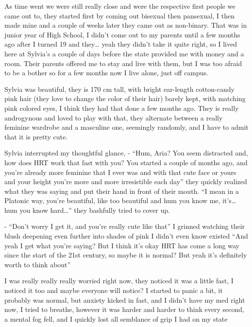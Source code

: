 \documentclass[hidelinks,12pt,a4paper]{book}
\begin{document}
As time went we were still really close and were the respective 
first people we came out to, they started first by coming out bisexual then pansexual, 
I then made mine and a couple of weeks later they came out as non-binary. That was in junior year of High School,
 I didn't come out to my parents until a few months ago after I turned 19 and they… yeah they didn't take it quite right, so
I lived here at Sylvia's a couple of days before the state provided me with money and a room. 
Their parents offered me to stay and live with them, but I was too afraid to be a bother so for a few months 
now I live alone, just off campus.\par 
\bigskip

Sylvia was beautiful, they is 170 cm tall, with bright ear-length cotton-candy pink hair 
(they love to change the color of their hair) barely kept, with matching pink colored eyes, 
I think they had that done a few months ago. They is really androgynous and loved to play with that, 
they alternate between a really feminine wardrobe and a masculine one, seemingly randomly, and 
I have to admit that it is pretty cute.\par
\bigskip

Sylvia interrupted my thoughtful glance,\newline
- “Hum, Aria? You seem distracted and, how does HRT work that fast with you? 
You started a couple of months ago, and you're already more feminine that I ever was and with that cute 
face or yours and your height you're more and more irresistible each day” they quickly realized what 
they was saying and put their hand in front of their mouth.\newline
“I mean in a Platonic way, you're beautiful, like too beautiful and hum you know me, it's… hum you know hard…” 
they bashfully tried to cover up.\par 
\bigskip

- “Don't worry I get it, and you're really cute like that” 
I grinned watching their blush deepening even further into shades of pink I didn't even know existed
“And yeah I get what you're saying? But I think it's okay HRT has come a 
long way since the start of the 21st century, so maybe it is normal? But yeah it's definitely worth to think about”\par
\bigskip

I was really really really worried right now, 
they noticed it was a little fast, I noticed it too and maybe everyone will notice? 
I started to panic a bit, it probably was normal, but anxiety kicked in fast, and I didn't have my med right now,
 I tried to breathe, however it was harder and harder to think every second, a mental fog fell, and I quickly lost all
semblance of grip I had on my state\par
\bigskip
\end{document}
